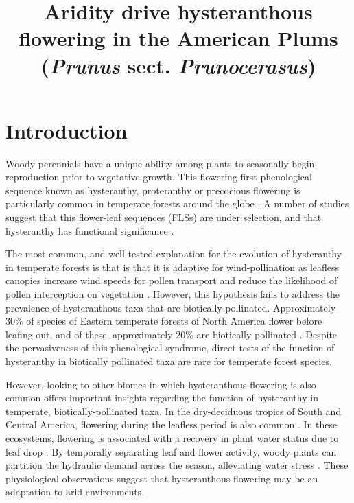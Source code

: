 \documentclass{article}\usepackage[]{graphicx}\usepackage[]{color}
\title{Aridity drive hysteranthous flowering in the American Plums (\textit{Prunus} sect. \textit{Prunocerasus})}
\begin{document}
\maketitle


\section*{Introduction}

\noindent Woody perennials have a unique ability among plants to seasonally begin reproduction prior to vegetative growth. This flowering-first phenological sequence known as hysteranthy, proteranthy or precocious flowering is particularly common in temperate forests around the globe \citep{Rathcke_1985}. A number of studies suggest that this flower-leaf sequences (FLSs) are under selection, and that hysteranthy has functional significance \citep{Gougherty2018,Buonaiuto2020,Guo2014}.

\noindent The most common, and well-tested explanation for the evolution of hysteranthy in temperate forests is that is that it is adaptive for wind-pollination as leafless canopies increase wind speeds for pollen transport and reduce the likelihood of pollen interception on vegetation \citep{Whitehead1969,Niklas1985}. However, this hypothesis fails to address the prevalence of hysteranthous taxa that are biotically-pollinated. Approximately 30\% of species of Eastern temperate forests of North America flower before leafing out, and of these, approximately 20\% are biotically pollinated  \citep{Buonaiuto2020}. Despite the pervasiveness of this phenological syndrome, direct tests of the function of hysteranthy in biotically pollinated taxa are rare for temperate forest species.

However, looking to other biomes in which hysteranthous flowering is also common offers important insights regarding the function of hysteranthy in temperate, biotically-pollinated taxa. In the dry-deciduous tropics of South and Central America, flowering during the leafless period is also common \citep{Rathcke_1985,Franklin2016}. In these ecosystems, flowering is associated with a recovery in plant water status due to leaf drop \citep{Borchert1983,Reich1984}. By temporally separating leaf and flower activity, woody plants can partition the hydraulic demand across the season, alleviating water stress \citep{Gougherty2018,Franklin2016}. These physiological observations suggest that hysteranthous flowering may be an adaptation to arid environments.
\end{document}
